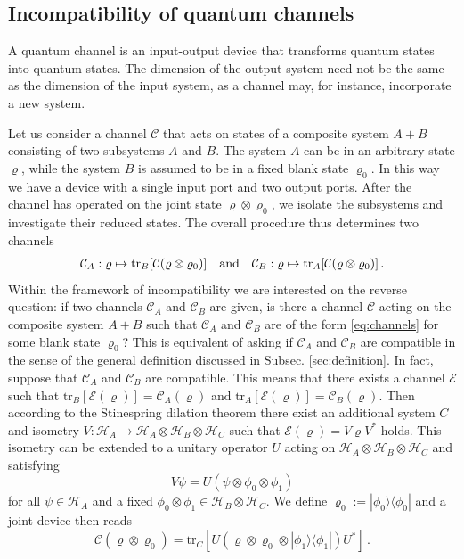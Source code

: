 \documentclass[12pt]{iopart}
\theoremstyle{definition}
\newcommand{\hi}{\mathcal{H}} %
\newcommand{\Cc}{\mathcal{C}} %
\newcommand{\Ec}{\mathcal{E}} %
\begin{document}
{%
\subsection{Incompatibility of quantum channels}

A quantum channel is an input-output device that transforms quantum states into quantum states. The dimension of the output system need not be the same as the dimension of the input system, as a channel may, for instance, incorporate a new system. 

Let us consider a channel $\Cc$ that acts on states of a composite system $A+B$ consisting of two subsystems $A$ and $B$. The system $A$ can be in an arbitrary state $\varrho$, while the system $B$ is assumed to be in a fixed blank state $\varrho_0$. 
In this way we have a device with a single input port and two output ports.
After the channel has operated on the joint state $\varrho \otimes \varrho_0$, we isolate the subsystems and investigate their reduced states.
The overall procedure thus determines two channels 
\begin{align}\label{eq:channels}
\Cc_A:\varrho \mapsto {\rm tr}_B[\Cc(\varrho \otimes \varrho_0)] \quad \textrm{and} \quad  \Cc_B:\varrho \mapsto {\rm tr}_A[\Cc(\varrho \otimes \varrho_0)] \, .
\end{align}
Within the framework of incompatibility we are interested on the reverse question: if two channels $\Cc_A$ and $\Cc_B$ are given, is there a channel $\Cc$ acting on the composite system $A+B$ such that $\Cc_A$ and $\Cc_B$ are of the form \eqref{eq:channels} for some blank state $\varrho_0$? 
This is equivalent of asking if $\Cc_A$ and $\Cc_B$ are compatible in the sense of the general definition discussed in Subsec. \ref{sec:definition}.
In fact, suppose that $\Cc_A$ and $\Cc_B$ are compatible. 
This means that there exists a channel $\Ec$ such that 
$\mbox{tr}_B [ \Ec (\varrho)] = \Cc_A(\varrho)$ and 
$\mbox{tr}_A [\Ec (\varrho)] =\Cc_B(\varrho)$. 
Then according to the Stinespring dilation theorem
there exist an additional system $C$ and 
isometry $V: \hi_A \to \hi_A \otimes \hi_B \otimes \hi_C$ 
such that $\Ec(\varrho) 
= V \varrho V^*$ holds.  
This isometry can be extended 
to a unitary operator $U$ acting on $\hi_A \otimes \hi_B \otimes \hi_C$
and satisfying 
\begin{equation}
V \psi = U (\psi  \otimes \phi_0 \otimes \phi_1)
\end{equation} 
for all $\psi \in \hi_A$ and a fixed $\phi_0 \otimes \phi_1 \in \hi_B \otimes \hi_C$.
We define $\varrho_0 := |\phi_0\rangle \langle \phi_0 |$ 
and a joint device then reads 
\begin{equation}
\Cc(\varrho \otimes \varrho_0) = \mbox{tr}_{C}[ U
 (\varrho \otimes \varrho_0 \otimes |\phi_1\rangle \langle \phi_1| ) U^*] \, .
 \end{equation}


}
\end{document}

